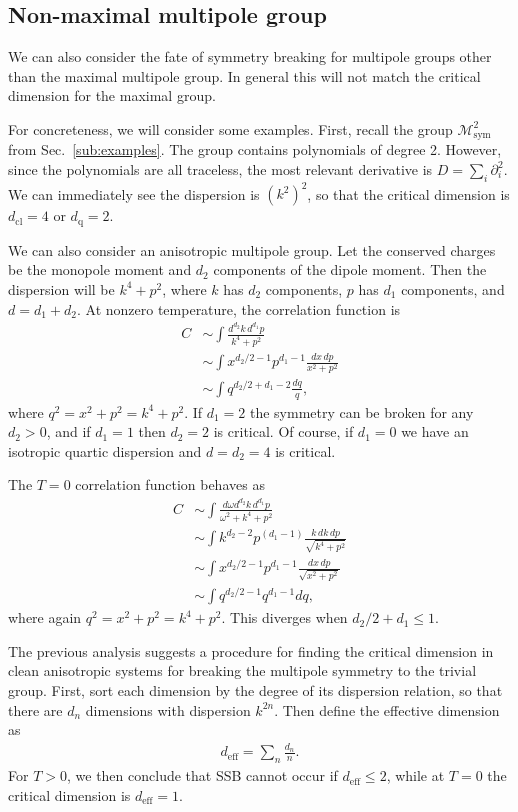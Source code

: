 \documentclass[prb,aps,twocolumn, amsfonts,amsmath,amssymb,nofootinbib,superscriptaddress]{revtex4-2}
\newcommand{\nn}{\nonumber\\}
\newcommand{\eff}{\text{eff}}
\newcommand{\cl}{\text{cl}}
\newcommand{\q}{\text{q}}
\begin{document}
\subsection{Non-maximal multipole group} \label{sub:nonmax}

We can also consider the fate of symmetry breaking for multipole groups other than the maximal multipole group. In general this will not match the critical dimension for the maximal group. 

For concreteness, we will consider some examples. First, recall the group $\mathcal{M}^2_\text{sym}$ from Sec.~\ref{sub:examples}. The group contains polynomials of degree 2. However, since the polynomials are all traceless, the most relevant derivative is $D = \sum_i \partial^2_i$.  We can immediately see the dispersion is $(k^2)^2$, so that the critical dimension is $d_\cl = 4$ or $d_\q = 2$.

We can also consider an anisotropic multipole group. 
Let the conserved charges be the monopole moment and $d_2$ components of the dipole moment. Then the dispersion will be $k^4 + p^2$, where $k$ has $d_2$ components, $p$ has $d_1$ components, and $d = d_1+d_2$. At nonzero temperature, the correlation function is
\begin{align}
C &\sim \int \frac{d^{d_2} k \, d^{d_1} p}{k^4 + p^2}\nn
&\sim \int x^{d_2/2 -1} p^{d_1-1} \frac{dx\, dp}{x^2 +p^2} \nn
&\sim \int q^{d_2/2 + d_1 - 2}\frac{dq}{q},
\end{align}
where $q^2 = x^2 + p^2 = k^4 + p^2$. 
If $d_1=2$ the symmetry can be broken for any $d_2>0$, and if $d_1=1$ then $d_2=2$  is critical. Of course, if $d_1=0$ we have an isotropic quartic dispersion and $d=d_2=4$ is critical. 

The $T=0$ correlation function behaves as
\begin{align}
C &\sim \int \frac{d\omega d^{d_2} k \, d^{d_1} p}{\omega^2 + k^4 + p^2}\nn
&\sim \int k^{d_2 - 2} p^{ (d_1-1)} \frac{k\,dk\, dp}{\sqrt{k^4 + p^2}} \nn
&\sim \int x^{d_2/2-1} p^{d_1-1} \frac{dx\, dp}{\sqrt{x^2 + p^2}} \nn
&\sim \int q^{d_2/2 -1} q^{d_1 -1} dq,
\end{align}
where again $q^2 = x^2 + p^2 = k^4 + p^2$. This diverges when $d_2/2 + d_1 \le 1$. 

The previous analysis suggests a procedure for finding the critical dimension in clean anisotropic systems for breaking the multipole symmetry to the trivial group. First, sort each dimension by the degree of its dispersion relation, so that there are $d_n$ dimensions with dispersion $k^{2n}$. Then define the effective dimension as 
\begin{align}
d_\eff = \sum_n \frac{d_n}{n}.
\end{align}
For $T>0$, we then conclude that SSB cannot occur if $d_\eff\le 2$, while at $T=0$ the critical dimension is $d_\eff = 1$.
\end{document}
